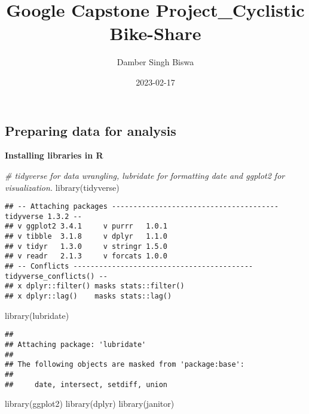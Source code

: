 \documentclass[
]{article}
\title{Google Capstone Project\_Cyclistic Bike-Share}
\author{Damber Singh Biswa}
\date{2023-02-17}
\newenvironment{Shaded}{\begin{snugshade}}{\end{snugshade}}
\newcommand{\CommentTok}[1]{\textcolor[rgb]{0.56,0.35,0.01}{\textit{#1}}}
\newcommand{\FunctionTok}[1]{\textcolor[rgb]{0.00,0.00,0.00}{#1}}
\newcommand{\NormalTok}[1]{#1}
\begin{document}
\maketitle

\hypertarget{preparing-data-for-analysis}{%
\subsection{Preparing data for
analysis}\label{preparing-data-for-analysis}}

\textbf{Installing libraries in R }

\begin{Shaded}
\begin{Highlighting}[]
\CommentTok{\# tidyverse for data wrangling, lubridate for formatting date and ggplot2 for visualization.}
\FunctionTok{library}\NormalTok{(tidyverse) }
\end{Highlighting}
\end{Shaded}

\begin{verbatim}
## -- Attaching packages --------------------------------------- tidyverse 1.3.2 --
## v ggplot2 3.4.1     v purrr   1.0.1
## v tibble  3.1.8     v dplyr   1.1.0
## v tidyr   1.3.0     v stringr 1.5.0
## v readr   2.1.3     v forcats 1.0.0
## -- Conflicts ------------------------------------------ tidyverse_conflicts() --
## x dplyr::filter() masks stats::filter()
## x dplyr::lag()    masks stats::lag()
\end{verbatim}

\begin{Shaded}
\begin{Highlighting}[]
\FunctionTok{library}\NormalTok{(lubridate) }
\end{Highlighting}
\end{Shaded}

\begin{verbatim}
## 
## Attaching package: 'lubridate'
## 
## The following objects are masked from 'package:base':
## 
##     date, intersect, setdiff, union
\end{verbatim}

\begin{Shaded}
\begin{Highlighting}[]
\FunctionTok{library}\NormalTok{(ggplot2)}
\FunctionTok{library}\NormalTok{(dplyr)}
\FunctionTok{library}\NormalTok{(janitor)}
\end{Highlighting}
\end{Shaded}
\end{document}
